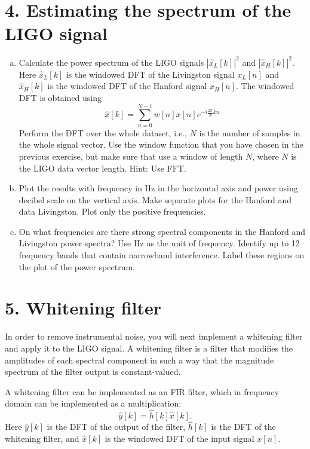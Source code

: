 \section{4. Estimating the spectrum of the LIGO signal}

\begin{enumerate}[a)]
  \item Calculate the power spectrum of the LIGO signals
        $|\hat{x}_L[k]|^2$ and $|\hat{x}_H[k]|^2$. Here $\hat{x}_L[k]$ is the
        windowed DFT of the Livingston signal $x_L[n]$ and $\hat{x}_H[k]$ is
        the windowed DFT of the Hanford signal $x_H[n]$. The windowed DFT is
        obtained using
        \begin{equation}
          \hat{x}[k] = \sum_{n=0}^{N-1} w[n]x[n]e^{-i\frac{2\pi}{N}kn}
          \label{dfteq}
        \end{equation}
        Perform the DFT over the whole dataset, i.e., $N$ is the number of samples in the whole
        signal vector. Use the window function that you have chosen in the previous exercise,
        but make sure that use a window of length $N$, where $N$ is the LIGO data vector length. Hint: Use FFT.

  \item Plot the results with frequency in Hz in the horizontal axis
    and power using decibel scale on the vertical axis. Make separate
    plots for the Hanford and data Livingston. Plot only the positive
    frequencies.

  \item On what frequencies are there strong spectral components in the
        Hanford and Livingston power spectra? Use Hz as the unit of
        frequency. Identify up to 12 frequency bands that contain narrowband interference.
        Label these regions on the plot of the power spectrum.

\end{enumerate}

\section{5. Whitening filter}

In order to remove instrumental noise, you will next implement a
whitening filter and apply it to the LIGO signal. A whitening filter
is a filter that modifies the amplitudes of each spectral component in
such a way that the magnitude spectrum of the filter output is constant-valued.

A whitening filter can be implemented as an FIR filter, which in frequency domain
can be implemented as a multiplication:
\begin{equation}
  \hat{y}[k] = \hat{h}[k]\hat{x}[k].
\end{equation}
Here $\hat{y}[k]$ is the DFT of the output of the filter, $\hat{h}[k]$ is the DFT of
the whitening filter, and $\hat{x}[k]$ is the windowed DFT of the input signal $x[n]$.

